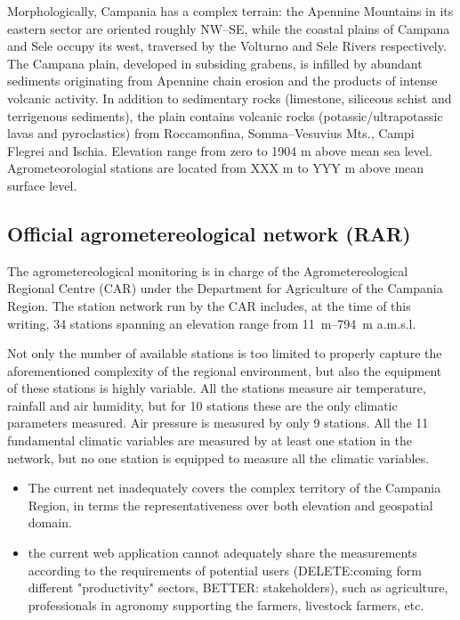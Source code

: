\documentclass[authoryear,preprint,review,12pt]{elsarticle}
\begin{document}
    Morphologically, Campania has a complex terrain: the Apennine Mountains in its eastern sector are oriented roughly NW–SE, while the coastal plains of Campana and Sele occupy its west, traversed by the Volturno and Sele Rivers respectively.
    The Campana plain, developed in subsiding grabens, is infilled by abundant sediments originating from Apennine chain erosion and the products of intense volcanic activity.
    In addition to sedimentary rocks (limestone, siliceous schist and terrigenous sediments), the plain contains volcanic rocks (potassic/ultrapotassic lavas and pyroclastics) from Roccamonfina, Somma–Vesuvius Mts., Campi Flegrei and Ischia.
    Elevation range from zero to 1904 m above mean sea level.
    Agrometeorologial stations are located from XXX m to YYY m above mean surface level.

\subsection{Official agrometereological network (RAR)}\label{RARStructure}
The agrometereological monitoring is in charge of the Agrometereological Regional Centre (CAR) under the Department for Agriculture of the Campania Region. The station network run by the CAR includes, at the time of this writing, 34 stations spanning an elevation range from \SIrange{11}{794}{\metre} a.m.s.l.

Not only the number of available stations is too limited to properly capture the aforementioned complexity of the regional environment, but also the equipment of these stations is highly variable.
All the stations measure air temperature, rainfall and air humidity, but for 10 stations these are the only climatic parameters measured.
Air pressure is measured by only 9 stations.
All the 11 fundamental climatic variables are measured by at least one station in the network, but no one station is equipped to measure all the climatic variables.

\begin{itemize}
    \item The current net inadequately covers the complex territory of the Campania Region, in terms the representativeness over both elevation and geospatial domain.
    \item the current web application cannot adequately share the measurements according to the requirements of potential users (DELETE:coming form different "productivity" sectors, BETTER: stakeholders), such as agriculture, professionals in agronomy supporting the farmers, livestock farmers, etc.
\end{itemize}
\end{document}

